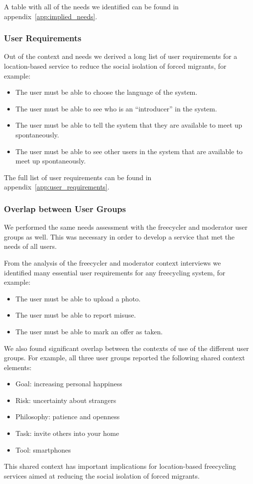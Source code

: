 A table with all of the needs we identified can be found in appendix~\ref{app:implied_needs}.

\subsubsection*{User Requirements}

Out of the context and needs we derived a long list of user requirements for a location-based service to reduce the social isolation of forced migrants, for example:

\begin{itemize}
    \item The user must be able to choose the language of the system.
    \item The user must be able to see who is an ``introducer'' in the system.
    \item The user must be able to tell the system that they are available to meet up spontaneously.
    \item The user must be able to see other users in the system that are available to meet up spontaneously.
\end{itemize}


The full list of user requirements can be found in appendix~\ref{app:user_requirements}.

\subsubsection*{Overlap between User Groups}

We performed the same needs assessment with the freecycler and moderator user groups as well. This was necessary in order to develop a service that met the needs of all users.

From the analysis of the freecycler and moderator context interviews we identified many essential user requirements for any freecycling system, for example:

\begin{itemize}
    \item The user must be able to upload a photo.
    \item The user must be able to report misuse.
    \item The user must be able to mark an offer as taken.
\end{itemize}

We also found significant overlap between the contexts of use of the different user groups. For example, all three user groups reported the following shared context elements:

\begin{itemize}
    \item Goal: increasing personal happiness
    \item Risk: uncertainty about strangers
    \item Philosophy: patience and openness
    \item Task: invite others into your home
    \item Tool: smartphones
\end{itemize}

This shared context has important implications for location-based freecycling services aimed at reducing the social isolation of forced migrants.
